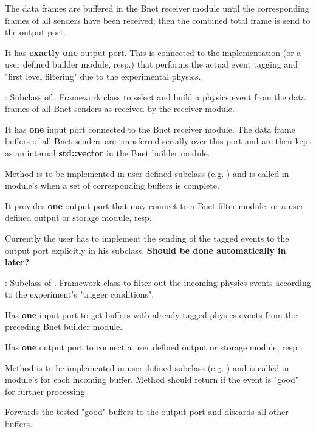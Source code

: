 \begin{compactdesc}
\begin{compactenum}
      The data frames are buffered in the Bnet receiver module until the 
      corresponding frames of all senders have been received; then the 
      combined total frame is send to the output port.
  \item It has {\bf exactly one} output port. This is connected to the 
       implementation (or a user defined builder module, resp.) 
      that performs the actual event tagging and "first level filtering" 
      due to the experimental physics.   
\end{compactenum}
\item[\class{bnet::BuilderModule}] : Subclass of . 
   Framework class to select and build a physics event from 
   the data frames of all Bnet senders as received by the receiver module.
\begin{compactenum}
  \item It has {\bf one} input port connected to the Bnet receiver module. 
      The data frame buffers of all Bnet senders are transferred serially 
      over this port and are then kept as an internal {\bf std::vector} in the Bnet builder module.
  \item Method  is to be implemented in user defined 
      subclass (e.g. ) and is called in module's 
       when a set of corresponding buffers is complete.
  \item It provides {\bf one} output port that may connect to a 
      Bnet filter module, or a user defined output or storage module, resp. 
  \item Currently the user has to implement the sending of the tagged 
      events to the output port explicitly in his subclass. 
      {\bf Should be done automatically in  later?}   
\end{compactenum}
\item[\class{bnet::FilterModule}] : Subclass of . 
   Framework class to filter out the incoming physics events 
   according to the experiment's "trigger conditions". 
\begin{compactenum}
  \item Has {\bf one} input port to get buffers with 
      already tagged physics events from the preceding Bnet builder module.
  \item Has {\bf one} output port to connect a user defined output or storage module, resp.
  \item Method  is to be implemented in user 
      defined subclass (e.g. ) and is called in 
      module's  for each incoming buffer. 
      Method should return  if the event is "good" for further processing.
  \item Forwards the tested "good" buffers to the output 
      port and discards all other buffers.
\end{compactenum}
\end{compactdesc}
